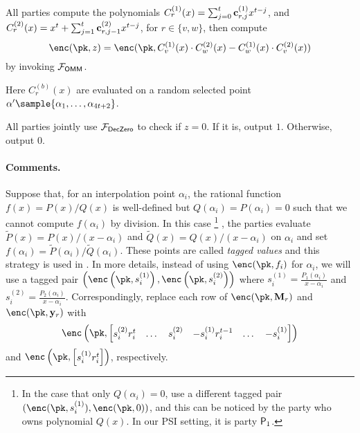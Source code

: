 \begin{algorithm}
\begin{algorithmic}[1]
\STATE All parties compute the polynomials $C_{r}^{(1)}(x)=\sum_{j=0}^t \mathbf{c}^{(1)}_{r,j} x^{t-j}$, and $C_{r}^{(2)}(x)=x^t+\sum_{j=1}^{t} \mathbf{c}_{r,j-1}^{(2)}x^{t-j}$, for $r\in\{v,w\}$, then compute $$\enc(\pk,z)=\enc(\pk, C_{v}^{(1)}(x)\cdot C_{w}^{(2)}(x)-C_{w}^{(1)}(x)\cdot C_{v}^{(2)}(x))$$ by invoking $\mathcal{F}_\mathsf{OMM}$.

Here $C_{r}^{(b)}(x)$ are evaluated on a random selected point $\alpha'\sample \{\alpha_1,\dots,\alpha_{4t+2}\}$.

\STATE All parties jointly use $\mathcal{F}_\mathsf{DecZero}$ to check if $z=0$. If it is, output $1$. Otherwise, output $0$.
\end{algorithmic}
\end{algorithm}


\paragraph{Comments.}
Suppose that, for an interpolation point $\alpha_i$, the rational function $f(x)=P(x)/Q(x)$ is well-defined but $Q(\alpha_i)=P(\alpha_i)=0$ such that we cannot compute $f(\alpha_i)$ by division. In this case
\footnote{In the case that only $Q(\alpha_i)=0$, use a different tagged pair $(\enc(\pk, s^{(1)}_i),\enc(\pk, 0))$, and this can be noticed by the party who owns polynomial $Q(x)$. In our PSI setting, it is party $\mathsf{P}_1$.} 
, the parties evaluate $\tilde P(x)=P(x)/(x-\alpha_i)$ and $\tilde Q(x)=Q(x)/(x-\alpha_i)$ on $\alpha_i$ and set $f(\alpha_i)=\tilde P(\alpha_i)/\tilde Q(\alpha_i)$. These points are called \emph{tagged values} and this strategy is used in \cite{minsky03}. In more details, instead of using $\enc(\pk,f_i)$ for $\alpha_i$, we will use a tagged pair $\left(\enc\left(\pk, s^{(1)}_i\right),\enc\left(\pk, s^{(2)}_i\right)\right)$ where $s^{(1)}_i=\frac{P_1(\alpha_i)}{x-\alpha_i}$ and $s^{(2)}_i=\frac{P_2(\alpha_i)}{x-\alpha_i}$. Correspondingly, replace each row of $\enc(\pk,\Mn_r)$ and $\enc(\pk,\yn_r)$ with $$\enc\left(\pk,\begin{bmatrix} s^{(2)}_ir_i^{t}&\dots&s^{(2)}_i &-s^{(1)}_i r_i^{t-1}&\dots&-s^{(1)}_i\end{bmatrix}\right)$$ and $\enc\left(\pk,\begin{bmatrix}s^{(1)}_ir_i^t\end{bmatrix}\right)$, respectively. 
 

